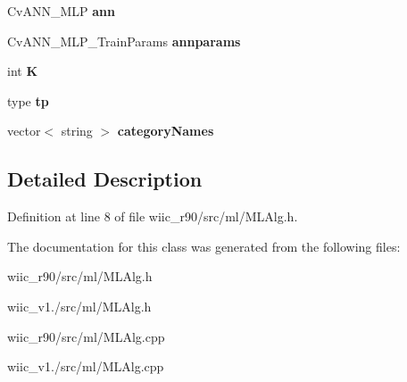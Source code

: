 \begin{DoxyCompactItemize}
\item 
\hypertarget{class_m_l_alg_adb1432782a067c9f8a1a8834d93642f5}{Cv\-A\-N\-N\-\_\-\-M\-L\-P {\bfseries ann}}\label{class_m_l_alg_adb1432782a067c9f8a1a8834d93642f5}

\item 
\hypertarget{class_m_l_alg_a92cf578aa93fd65a4ef521301b92839b}{Cv\-A\-N\-N\-\_\-\-M\-L\-P\-\_\-\-Train\-Params {\bfseries annparams}}\label{class_m_l_alg_a92cf578aa93fd65a4ef521301b92839b}

\item 
\hypertarget{class_m_l_alg_ab2be419780446f10b561fc5b2aaaeeda}{int {\bfseries K}}\label{class_m_l_alg_ab2be419780446f10b561fc5b2aaaeeda}

\item 
\hypertarget{class_m_l_alg_afc48fbeac702aeb6b9d32c99da80dc54}{type {\bfseries tp}}\label{class_m_l_alg_afc48fbeac702aeb6b9d32c99da80dc54}

\item 
\hypertarget{class_m_l_alg_a5d842c24808322a6077c69dfbe0088d0}{vector$<$ string $>$ {\bfseries category\-Names}}\label{class_m_l_alg_a5d842c24808322a6077c69dfbe0088d0}

\end{DoxyCompactItemize}


\subsection{Detailed Description}


Definition at line 8 of file wiic\-\_\-r90/src/ml/\-M\-L\-Alg.\-h.



The documentation for this class was generated from the following files\-:\begin{DoxyCompactItemize}
\item 
wiic\-\_\-r90/src/ml/\-M\-L\-Alg.\-h\item 
wiic\-\_\-v1./src/ml/\-M\-L\-Alg.\-h\item 
wiic\-\_\-r90/src/ml/\-M\-L\-Alg.\-cpp\item 
wiic\-\_\-v1./src/ml/\-M\-L\-Alg.\-cpp\end{DoxyCompactItemize}
